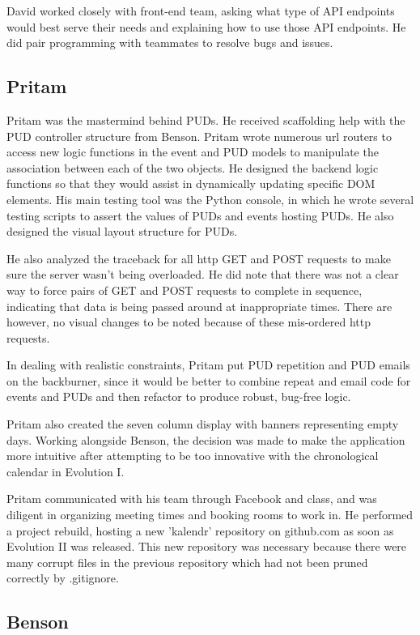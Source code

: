 \documentclass[a4paper]{article}
\begin{document}
David worked closely with front-end team, asking what type of API endpoints would best serve their needs and explaining how to use those API endpoints. He did pair programming with teammates to resolve bugs and issues.
\subsection{Pritam}

Pritam was the mastermind behind PUDs. He received scaffolding help with the PUD controller structure from Benson. Pritam wrote numerous url routers to access new logic functions in the event and PUD models to manipulate the association between each of the two objects. He designed the backend logic functions so that they would assist in dynamically updating specific DOM elements. His main testing tool was the Python console, in which he wrote several testing scripts to assert the values of PUDs and events hosting PUDs. He also designed the visual layout structure for PUDs. 

He also analyzed the traceback for all http GET and POST requests to make sure the server wasn't being overloaded. He did note that there was not a clear way to force pairs of GET and POST requests to complete in sequence, indicating that data is being passed around at inappropriate times. There are however, no visual changes to be noted because of these mis-ordered http requests.

In dealing with realistic constraints, Pritam put PUD repetition and PUD emails on the backburner, since it would be better to combine repeat and email code for events and PUDs and then refactor to produce robust, bug-free logic.

Pritam also created the seven column display with banners representing empty days. Working alongside Benson, the decision was made to make the application more intuitive after attempting to be too innovative with the chronological calendar in Evolution I.

Pritam communicated with his team through Facebook and class, and was diligent in organizing meeting times and booking rooms to work in. He performed a project rebuild, hosting a new 'kalendr' repository on github.com as soon as Evolution II was released. This new repository was necessary because there were many corrupt files in the previous repository which had not been pruned correctly by .gitignore.
\subsection{Benson}
\end{document}
